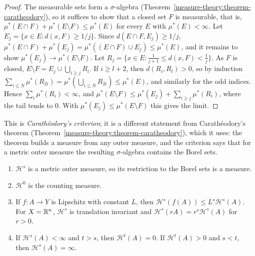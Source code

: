 \begin{proof}
The measurable sets form a $\sigma$-algebra (Theorem~\ref{measure-theory:theorem-caratheodory}), so it suffices to show that a closed set $F$ is measurable, that is,
$\mu^*(E \cap F) + \mu^*(E \setminus F) \leq \mu^*(E)$ for every $E$ with $\mu^*(E) < \infty$. Let $E_j = \{x \in E : d(x, F) \geq 1/j\}$. Since $d(E \cap F, E_j) \geq 1/j$,
$\mu^*(E \cap F) + \mu^*(E_j) = \mu^*((E \cap F) \cup E_j) \leq \mu^*(E)$, and it remains to show $\mu^*(E_j) \to \mu^*(E \setminus F)$. Let
$R_j = \{x \in E : \frac1{j+1} \leq d(x, F) < \frac1j\}$. As $F$ is closed, $E \setminus F = E_j \cup \bigcup_{i \geq j}R_i$. If $i \geq l + 2$, then $d(R_i, R_l) > 0$, so by induction
$\sum_{i \leq N}\mu^*(R_{2i}) = \mu^*(\bigcup_{i \leq N}R_{2i}) \leq \mu^*(E)$, and similarly for the odd indices. Hence $\sum_i\mu^*(R_i) < \infty$, and
$\mu^*(E \setminus F) \leq \mu^*(E_j) + \sum_{i \geq j}\mu^*(R_i)$, where the tail tends to $0$. With $\mu^*(E_j) \leq \mu^*(E \setminus F)$ this gives the limit.
\end{proof}

This is \emph{Carath\'eodory's criterion}; it is a different statement from Carath\'eodory's theorem (Theorem~\ref{measure-theory:theorem-caratheodory}), which it uses: the theorem builds a measure
from any outer measure, and the criterion says that for a metric outer measure the resulting $\sigma$-algebra contains the Borel sets.

\begin{proposition}\label{measure-theory:proposition-hausdorff}
\begin{enumerate}
\item $\mathcal{H}^s$ is a metric outer measure, so its restriction to the Borel sets is a measure.
\item $\mathcal{H}^0$ is the counting measure.
\item If $f \colon A \to Y$ is Lipschitz with constant $L$, then $\mathcal{H}^s(f(A)) \leq L^s\mathcal{H}^s(A)$. For $X = \mathbb{R}^n$, $\mathcal{H}^s$ is translation invariant and
$\mathcal{H}^s(rA) = r^s\mathcal{H}^s(A)$ for $r > 0$.
\item If $\mathcal{H}^s(A) < \infty$ and $t > s$, then $\mathcal{H}^t(A) = 0$. If $\mathcal{H}^t(A) > 0$ and $s < t$, then $\mathcal{H}^s(A) = \infty$.
\end{enumerate}
\end{proposition}

